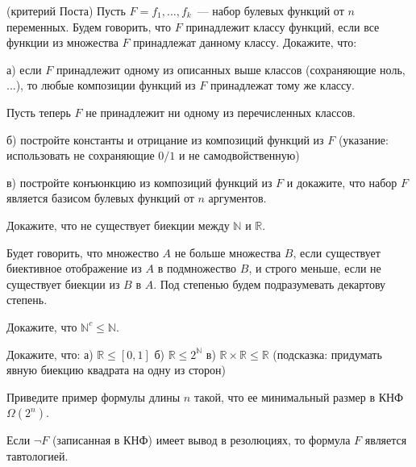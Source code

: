 \begin{task} (критерий Поста)
	Пусть $F = {f_1, \dots, f_k}$~--- набор булевых функций от $n$
    переменных. Будем говорить, что $F$ принадлежит классу функций,
    если все функции из множества $F$ принадлежат данному классу.
    Докажите, что:

	а) если $F$ принадлежит одному из описанных выше классов
    (сохраняющие ноль, ...), то любые
    композиции функций из $F$ принадлежат тому же классу.
    
    Пусть теперь $F$ не принадлежит ни одному из перечисленных
    классов.
    
    б) постройте константы и отрицание из композиций функций из $F$
    (указание: использовать не сохраняющие $0/1$ и не самодвойственную)

    в) постройте конъюнкцию из композиций функций из $F$ и докажите,
    что набор $F$ является базисом булевых функций от $n$ аргументов.

\end{task}



\breakline


\begin{ptask}{1}
    Докажите, что не существует биекции между $\mathbb{N}$ и $\mathbb{R}$.
\end{ptask}

Будет говорить, что множество $A$ не больше множества $B$, если
существует биективное отображение из $A$ в подмножество $B$, и строго
меньше, если не существует биекции из $B$ в $A$. Под степенью будем
подразумевать декартову степень.

\begin{ptask}{2}
    Докажите, что $\mathbb{N}^c \le \mathbb{N}$.
\end{ptask}

\begin{ptask}{3}
    Докажите, что:
    а) $\mathbb{R} \le [0, 1]$
    б) $\mathbb{R} \le 2^{\mathbb{N}}$
    в) $\mathbb{R} \times \mathbb{R} \le \mathbb{R}$ (подсказка:
	    придумать явную биекцию квадрата на одну из сторон)
\end{ptask}

\begin{ptask}{4}
    Приведите пример формулы длины $n$ такой, что ее минимальный
    размер в КНФ $\Omega(2^n)$.
\end{ptask}


\begin{ptask}{5}
    Если $\neg F$ (записанная в КНФ) имеет вывод в резолюциях, то
    формула $F$ является тавтологией.
\end{ptask}

